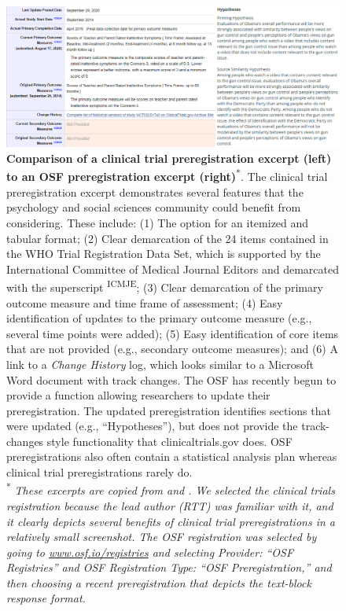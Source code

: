 \documentclass[authordate, meta, issue]{jote-new-article}
\begin{document}
\begin{figure}[t]
  \begin{fullwidth}
    \label{fig:rId9}

    \includegraphics[width=\linewidth]{media/image4.png}

    \caption[check]{\textbf{Comparison of a clinical trial preregistration excerpt (left) to an OSF preregistration excerpt (right)}\protect\textsuperscript{*}. The clinical trial preregistration excerpt demonstrates several features that the psychology and social sciences community could benefit from considering. These include: (1) The option for an itemized and tabular format; (2) Clear demarcation of the 24 items contained in the WHO Trial Registration Data Set, which is supported by the International Committee of Medical Journal Editors and demarcated with the superscript \textsuperscript{ICMJE}; (3) Clear demarcation of the primary outcome measure and time frame of assessment; (4) Easy identification of updates to the primary outcome measure (e.g., several time points were added); (5) Easy identification of core items that are not provided (e.g., secondary outcome measures); and (6) A link to a \emph{Change History} log, which looks similar to a Microsoft Word document with track changes. The OSF has recently begun to provide a function allowing researchers to update their preregistration. The updated preregistration identifies sections that were updated (e.g., “Hypotheses”), but does not provide the track-changes style functionality that clinicaltrials.gov does. OSF preregistrations also often contain a statistical analysis plan whereas clinical trial preregistrations rarely do.\\  {\footnotesize\textsuperscript{*} \emph{These excerpts are copied from \parencites{Arnold2013} and \parencites{Berent2021}. We selected the clinical trials registration because the lead author (RTT) was familiar with it, and it clearly depicts several benefits of clinical trial preregistrations in a relatively small screenshot. The OSF registration was selected by going to \href{http://www.osf.io/registries}{www.osf.io/registries} and selecting \emph{Provider}: “OSF Registries” and \emph{OSF Registration Type}: “OSF Preregistration,” and then choosing a recent preregistration that depicts the text-block response format. }}}

  \end{fullwidth}
\end{figure}
\end{document}
